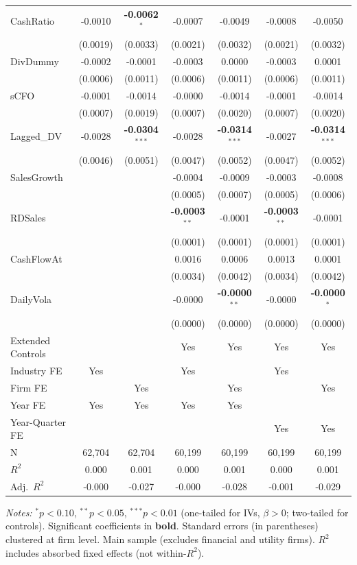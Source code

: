 \begin{landscape}
\begin{table}[H]
\begin{tabular}{lcccccc}
CashRatio & -0.0010 & \textbf{-0.0062}$^{*}$ & -0.0007 & -0.0049 & -0.0008 & -0.0050 \\
 & (0.0019) & (0.0033) & (0.0021) & (0.0032) & (0.0021) & (0.0032) \\
DivDummy & -0.0002 & -0.0001 & -0.0003 & 0.0000 & -0.0003 & 0.0001 \\
 & (0.0006) & (0.0011) & (0.0006) & (0.0011) & (0.0006) & (0.0011) \\
sCFO & -0.0001 & -0.0014 & -0.0000 & -0.0014 & -0.0001 & -0.0014 \\
 & (0.0007) & (0.0019) & (0.0007) & (0.0020) & (0.0007) & (0.0020) \\
Lagged\_DV & -0.0028 & \textbf{-0.0304}$^{***}$ & -0.0028 & \textbf{-0.0314}$^{***}$ & -0.0027 & \textbf{-0.0314}$^{***}$ \\
 & (0.0046) & (0.0051) & (0.0047) & (0.0052) & (0.0047) & (0.0052) \\
SalesGrowth &  &  & -0.0004 & -0.0009 & -0.0003 & -0.0008 \\
 &  &  & (0.0005) & (0.0007) & (0.0005) & (0.0006) \\
RDSales &  &  & \textbf{-0.0003}$^{**}$ & -0.0001 & \textbf{-0.0003}$^{**}$ & -0.0001 \\
 &  &  & (0.0001) & (0.0001) & (0.0001) & (0.0001) \\
CashFlowAt &  &  & 0.0016 & 0.0006 & 0.0013 & 0.0001 \\
 &  &  & (0.0034) & (0.0042) & (0.0034) & (0.0042) \\
DailyVola &  &  & -0.0000 & \textbf{-0.0000}$^{**}$ & -0.0000 & \textbf{-0.0000}$^{*}$ \\
 &  &  & (0.0000) & (0.0000) & (0.0000) & (0.0000) \\
\midrule
Extended Controls &  &  & Yes & Yes & Yes & Yes \\
Industry FE & Yes &  & Yes &  & Yes &  \\
Firm FE &  & Yes &  & Yes &  & Yes \\
Year FE & Yes & Yes & Yes & Yes &  &  \\
Year-Quarter FE &  &  &  &  & Yes & Yes \\
\midrule
N & 62,704 & 62,704 & 60,199 & 60,199 & 60,199 & 60,199 \\
$R^2$ & 0.000 & 0.001 & 0.000 & 0.001 & 0.000 & 0.001 \\
Adj.~$R^2$ & -0.000 & -0.027 & -0.000 & -0.028 & -0.001 & -0.029 \\
\bottomrule
\end{tabular}
\begin{minipage}{\linewidth}
\vspace{2pt}\scriptsize
\textit{Notes:} $^{*}p<0.10$, $^{**}p<0.05$, $^{***}p<0.01$ (one-tailed for IVs, $\beta > 0$; two-tailed for controls).
 Significant coefficients in \textbf{bold}.
 Standard errors (in parentheses) clustered at firm level.
 Main sample (excludes financial and utility firms).
 $R^2$ includes absorbed fixed effects (not within-$R^2$).
\end{minipage}
\end{table}
\end{landscape}